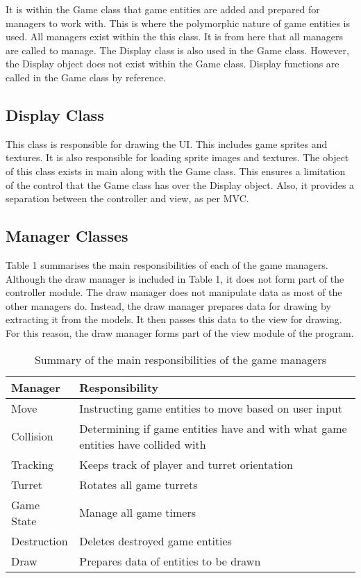 \documentclass[10pt,twocolumn]{witseiepaper}
\begin{document}
It is within the Game class that game entities are added and prepared for managers to work with. This is where the polymorphic nature of game entities is used. All managers exist within the this class. It is from here that all managers are called to manage. The Display class is also used in the Game class. However, the Display object does not exist within the Game class. Display functions are called in the Game class by reference. 

\subsection{Display Class}
This class is responsible for drawing the UI. This includes game sprites and textures. It is also responsible for loading sprite images and textures. The object of this class exists in main along with the Game class. This ensures a limitation of the control that the Game class has over the Display object. Also, it provides a separation between the controller and view, as per MVC.

\subsection{Manager Classes}
Table 1 summarises the main responsibilities of each of the game managers. Although the draw manager is included in Table 1, it does not form part of the controller module. The draw manager does not manipulate data as most of the other managers do. Instead, the draw manager prepares data for drawing by extracting it from the models. It then passes this data to the view for drawing. For this reason, the draw manager forms part of the view module of the program. 
\begin{table}[h]
	\centering
	\caption{Summary of the main responsibilities of the game managers}
	\begin{tabular}{|>{\centering\arraybackslash}m{2cm}|>{\centering\arraybackslash}m{4.5cm}|}
		\hline 
		\textbf{Manager} & \textbf{Responsibility} \\ 
		\hline 
		Move & Instructing game entities to move based on user input \\ 
		\hline 
		Collision & Determining if game entities have and with what game 								entities have collided with \\ 
		\hline 
		Tracking & Keeps track of player and turret orientation \\ 
		\hline 
		Turret & Rotates all game turrets \\ 
		\hline 
		Game State & Manage all game timers \\ 
		\hline 
		Destruction & Deletes destroyed game entities \\ 
		\hline 
		Draw & Prepares data of entities to be drawn \\ 
		\hline 
	\end{tabular} 
\end{table}
\end{document}
